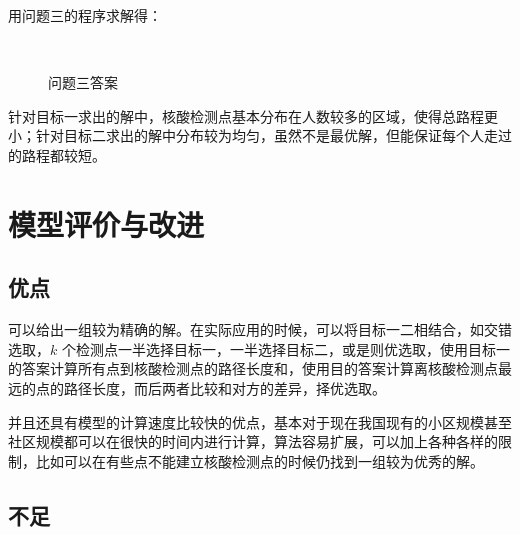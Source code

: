 \documentclass{cumcmthesis}
\begin{document}
用问题三的程序求解得：

\begin{figure}[H]
	\centering
	\\	
	\caption{问题三答案}
\end{figure}

针对目标一求出的解中，核酸检测点基本分布在人数较多的区域，使得总路程更小；针对目标二求出的解中分布较为均匀，虽然不是最优解，但能保证每个人走过的路程都较短。

\section{模型评价与改进}

\subsection{优点}

可以给出一组较为精确的解。在实际应用的时候，可以将目标一二相结合，如交错选取，$k$ 个检测点一半选择目标一，一半选择目标二，或是则优选取，使用目标一的答案计算所有点到核酸检测点的路径长度和，使用目的答案计算离核酸检测点最远的点的路径长度，而后两者比较和对方的差异，择优选取。

并且还具有模型的计算速度比较快的优点，基本对于现在我国现有的小区规模甚至社区规模都可以在很快的时间内进行计算，算法容易扩展，可以加上各种各样的限制，比如可以在有些点不能建立核酸检测点的时候仍找到一组较为优秀的解。

\subsection{不足}
\end{document}
